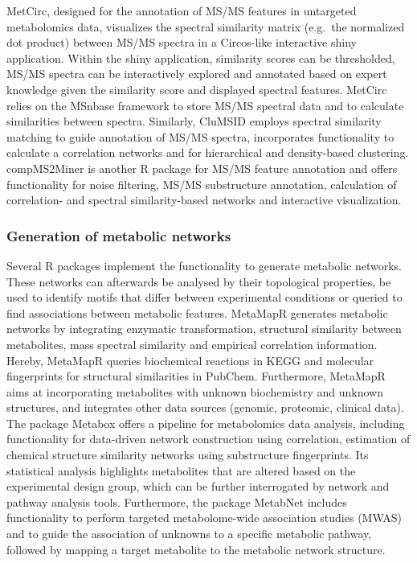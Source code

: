 \documentclass[]{article}
\begin{document}
MetCirc, designed for the annotation of MS/MS features in untargeted metabolomics data, visualizes the spectral similarity matrix (e.g.~the normalized dot product) between MS/MS spectra in a Circos-like interactive shiny application. Within the shiny application, similarity scores can be thresholded, MS/MS spectra can be interactively explored and annotated based on expert knowledge given the similarity score and displayed spectral features. MetCirc relies on the MSnbase framework to store MS/MS spectral data and to calculate similarities between spectra. Similarly, CluMSID employs spectral similarity matching to guide annotation of MS/MS spectra, incorporates functionality to calculate a correlation networks and for hierarchical and density-based clustering. compMS2Miner is another R package for MS/MS feature annotation and offers functionality for noise filtering, MS/MS substructure annotation, calculation of correlation- and spectral similarity-based networks and interactive visualization.

\hypertarget{generation-of-metabolic-networks}{%
\subsubsection{Generation of metabolic networks}\label{generation-of-metabolic-networks}}

Several R packages implement the functionality to generate metabolic networks. These networks can afterwards be analysed by their topological properties, be used to identify motifs that differ between experimental conditions or queried to find associations between metabolic features. MetaMapR generates metabolic networks by integrating enzymatic transformation, structural similarity between metabolites, mass spectral similarity and empirical correlation information. Hereby, MetaMapR queries biochemical reactions in KEGG and molecular fingerprints for structural similarities in PubChem. Furthermore, MetaMapR aims at incorporating metabolites with unknown biochemistry and unknown structures, and integrates other data sources (genomic, proteomic, clinical data). The package Metabox offers a pipeline for metabolomics data analysis, including functionality for data-driven network construction using correlation, estimation of chemical structure similarity networks using substructure fingerprints. Its statistical analysis highlights metabolites that are altered based on the experimental design group, which can be further interrogated by network and pathway analysis tools. Furthermore, the package MetabNet includes functionality to perform targeted metabolome-wide association studies (MWAS) and to guide the association of unknowns to a specific metabolic pathway, followed by mapping a target metabolite to the metabolic network structure.
\end{document}
